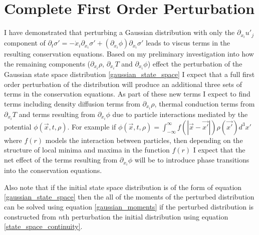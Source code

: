 \documentclass[%
 twocolumn,
 amsmath,amssymb,
 aps,
]{revtex4-1}
\begin{document}
\section{Complete First Order Perturbation}
I have demonstrated that perturbing a Gaussian distribution with only the $\partial_{x_i}u'_j$ component of $\partial_t \sigma'=-\dot{x}_i\partial_{x_i}\sigma'+\left(\partial_{x_i}\phi\right)\partial_{\dot{x}_i}\sigma'$ leads to viscus terms in the resulting conservation equations. Based on my preliminary investigation into how the remaining components ($\partial_{x_i}\rho$, $\partial_{x_i}T$ and $\partial_{x_i}\phi$) effect the perturbation of the Gaussian state space distribution \eqref{gaussian_state_space} I expect that a full first order perturbation of the distribution will produce an additional three sets of terms in the conservation equations. As part of these new terms I expect to find terms including density diffusion terms from $\partial_{x_i}\rho$, thermal conduction terms from $\partial_{x_i}T$ and terms resulting from $\partial_{x_i}\phi$ due to particle interactions mediated by the potential $\phi\left(\vec{x}, t, \rho\right)$. For example if $\phi\left(\vec{x}, t, \rho\right)=\int_{-\infty}^{\infty}f(|\vec{x}-\vec{x'}|)\rho(\vec{x'})d^3x'$ where $f(r)$ models the interaction between particles, then depending on the structure of local minima and maxima in the function $f(r)$ I expect that the net effect of the terms resulting from $\partial_{x_i}\phi$ will be to introduce phase transitions into the conservation equations.

Also note that if the initial state space distribution is of the form of equation \eqref{gaussian_state_space} then the all of the moments of the perturbed distribution can be solved using equation \eqref{gaussian_moments} if the perturbed distribution is constructed from $n$th perturbation the initial distribution using equation \eqref{state_space_continuity}.
\end{document}
